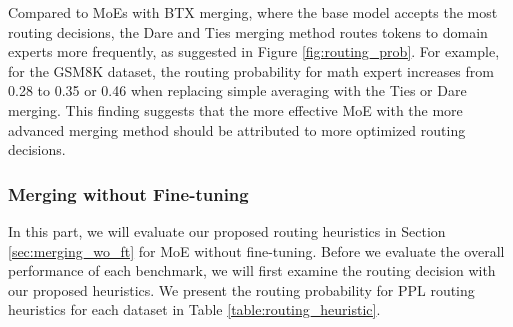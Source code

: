 Compared to MoEs with BTX merging, where the base model accepts the most routing decisions, the Dare and Ties merging method routes tokens to domain experts more frequently, as suggested in Figure \ref{fig:routing_prob}. For example, for the GSM8K dataset, the routing probability for math expert increases from 0.28 to 0.35 or 0.46 when replacing simple averaging with the Ties or Dare merging. This finding suggests that the more effective MoE with the more advanced merging method should be attributed to more optimized routing decisions.


\subsubsection{Merging without Fine-tuning}

In this part, we will evaluate our proposed routing heuristics in Section \ref{sec:merging_wo_ft} for MoE without fine-tuning.
Before we evaluate the overall performance of each benchmark, we will first examine the routing decision with our proposed heuristics. We present the routing probability for PPL routing heuristics for each dataset in Table \ref{table:routing_heuristic}.

\begin{table}[!htb]
\centering
{}
\caption{\label{table:routing_heuristic} \textbf{Routing probability of PPL routing for each dataset.} The largest probability are in bold, and the second-largest are underlined.}
\end{table}

